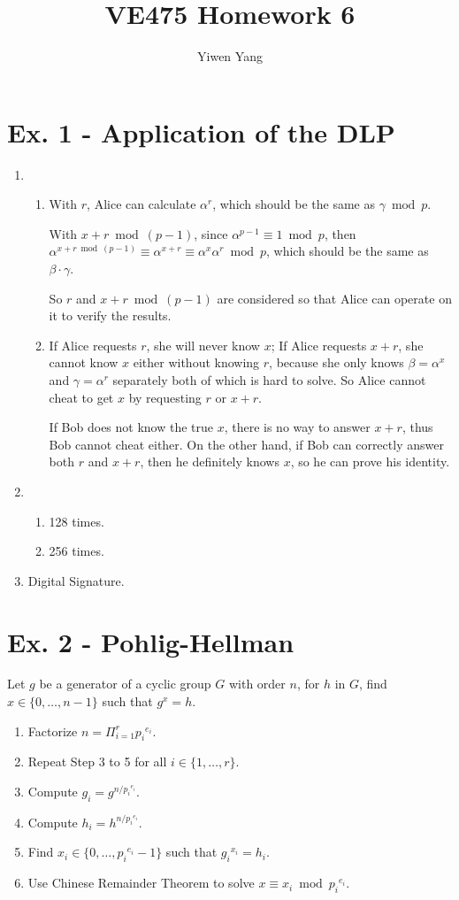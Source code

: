 \documentclass[12pt]{article}
\title{VE475 Homework 6}
\author{Yiwen Yang}
\begin{document}
\date{}
\maketitle

\section*{Ex. 1 - Application of the DLP}

	\begin{enumerate}
		\item
			\begin{enumerate}
				\item
					With $r$, Alice can calculate $\alpha^r$, which should be the same as $\gamma\bmod p$.

					With $x+r\bmod(p-1)$, since $\alpha^{p-1}\equiv 1\bmod p$, then $\alpha^{x+r\bmod(p-1)}\equiv\alpha^{x+r}\equiv\alpha^x\alpha^r\bmod p$, which should be the same as $\beta\cdot\gamma$.

					So $r$ and $x+r\bmod(p-1)$ are considered so that Alice can operate on it to verify the results.
				\item
					If Alice requests $r$, she will never know $x$; If Alice requests $x+r$, she cannot know $x$ either without knowing $r$, because she only knows $\beta=\alpha^x$ and $\gamma=\alpha^r$ separately both of which is hard to solve. So Alice cannot cheat to get $x$ by requesting $r$ or $x+r$.

					If Bob does not know the true $x$, there is no way to answer $x+r$, thus Bob cannot cheat either. On the other hand, if Bob can correctly answer both $r$ and $x+r$, then he definitely knows $x$, so he can prove his identity.
			\end{enumerate}
		\item
			\begin{enumerate}
				\item 128 times.
				\item 256 times.
			\end{enumerate}
		\item Digital Signature.
	\end{enumerate}

\section*{Ex. 2 - Pohlig-Hellman}

	Let $g$ be a generator of a cyclic group $G$ with order $n$, for $h$ in $G$, find $x\in\{0,\ldots,n-1\}$ such that $g^x=h$.
	\begin{enumerate}
		\item Factorize $n=\Pi_{i=1}^r {p_i}^{e_i}$.
		\item Repeat Step 3 to 5 for all $i\in\{1,\ldots,r\}$.
		\item Compute $g_i=g^{n/{p_i}^{e_i}}$.
		\item Compute $h_i=h^{n/{p_i}^{e_i}}$.
		\item Find $x_i\in\{0,\ldots,{p_i}^{e_i}-1\}$ such that ${g_i}^{x_i}={h_i}$.
		\item Use Chinese Remainder Theorem to solve $x\equiv x_i \bmod {p_i}^{e_i}$.
	\end{enumerate}
\end{document}
